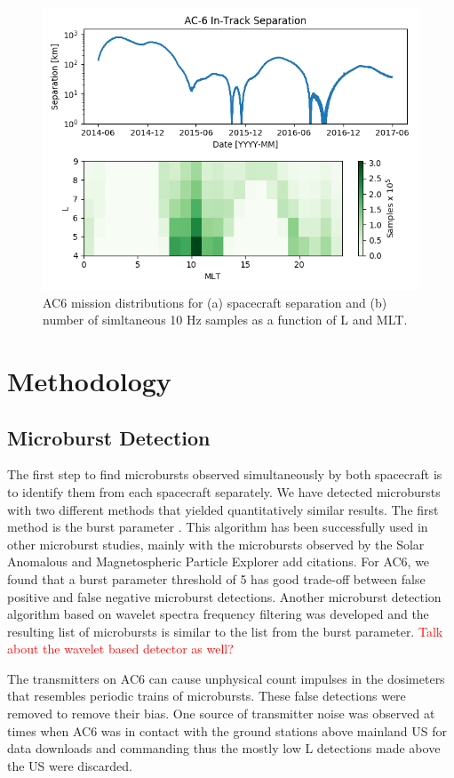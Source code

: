 \documentclass[draft]{agujournal2019}
\begin{document}
\begin{figure}
\includegraphics[width=\textwidth]{fig1.png}
\caption{AC6 mission distributions for (a) spacecraft separation and (b) number of simltaneous 10 Hz samples as a function of L and MLT.} \label{fig1}
\end{figure}

\section{Methodology}
\subsection{Microburst Detection}
The first step to find microbursts observed simultaneously by both spacecraft is to identify them from each spacecraft separately. We have detected microbursts with two different methods that yielded quantitatively similar results. The first method is the burst parameter \cite{O'Brien2003}. This algorithm has been successfully used in other microburst studies, mainly with the microbursts observed by the Solar Anomalous and Magnetospheric Particle Explorer add citations. For AC6, we found that a burst parameter threshold of 5 has good trade-off between false positive and false negative microburst detections. Another microburst detection algorithm based on wavelet spectra frequency filtering was developed and the resulting list of microbursts is similar to the list from the burst parameter. \textcolor{red}{Talk about the wavelet based detector as well?}

The transmitters on AC6 can cause unphysical count impulses in the dosimeters that resembles periodic trains of microbursts. These false detections were removed to remove their bias. One source of transmitter noise was observed at times when AC6 was in contact with the ground stations above mainland US for data downloads and commanding thus the mostly low L detections made above the US were discarded. 
\end{document}
